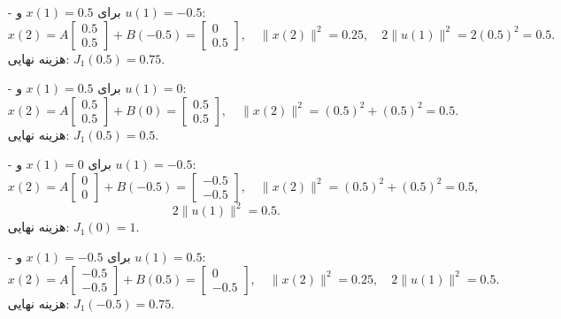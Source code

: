 \documentclass[14pt, a4paper]{extarticle}
\begin{document}
	\begin{itemize}
		\item[-] برای \( x(1) = 0.5 \) و \( u(1) = -0.5 \):
		\[
		x(2) = A \begin{bmatrix} 0.5 \\ 0.5 \end{bmatrix} + B(-0.5) = \begin{bmatrix} 0 \\ 0.5 \end{bmatrix}, \quad \|x(2)\|^2 = 0.25, \quad 2\|u(1)\|^2 = 2(0.5)^2 = 0.5.
		\]
		هزینه نهایی: \( J_1(0.5) = 0.75 \).\\
		
		\item[-] برای \( x(1) = 0.5 \) و \( u(1) = 0 \):
		\[
		x(2) = A \begin{bmatrix} 0.5 \\ 0.5 \end{bmatrix} + B(0) = \begin{bmatrix} 0.5 \\ 0.5 \end{bmatrix}, \quad \|x(2)\|^2 = (0.5)^2 + (0.5)^2 = 0.5.
		\]
		هزینه نهایی: \( J_1(0.5) = 0.5 \).\\
		
		\item[-] برای \( x(1) = 0 \) و \( u(1) = -0.5 \):
		\[
		x(2) = A \begin{bmatrix} 0 \\ 0 \end{bmatrix} + B(-0.5) = \begin{bmatrix} -0.5 \\ -0.5 \end{bmatrix}, \quad \|x(2)\|^2 = (0.5)^2 + (0.5)^2 = 0.5, 
		\]
		\[
		\quad 2\|u(1)\|^2 = 0.5.
		\]
		هزینه نهایی: \( J_1(0) = 1 \).\\
		
		
	
		
		\item[-] برای \( x(1) = -0.5 \) و \( u(1) = 0.5 \):
		\[
		x(2) = A \begin{bmatrix} -0.5 \\ -0.5 \end{bmatrix} + B(0.5) = \begin{bmatrix} 0 \\ -0.5 \end{bmatrix}, \quad \|x(2)\|^2 = 0.25, \quad 2\|u(1)\|^2 = 0.5.
		\]
		هزینه نهایی: \( J_1(-0.5) = 0.75 \).
	\end{itemize}
\end{document}
